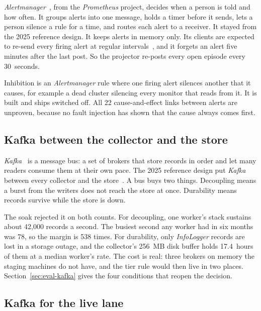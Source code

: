 \textit{Alertmanager}~\cite{ref:alertmanager}, from the \textit{Prometheus} project, decides when a person is told and how often. It groups alerts into one message, holds a timer before it sends, lets a person silence a rule for a time, and routes each alert to a receiver. It stayed from the 2025 reference design. It keeps alerts in memory only. Its clients are expected to re-send every firing alert at regular intervals~\cite{ref:amapi}, and it forgets an alert five minutes after the last post. So the projector re-posts every open episode every 30~seconds.

Inhibition is an \textit{Alertmanager} rule where one firing alert silences another that it causes, for example a dead cluster silencing every monitor that reads from it. It is built and ships switched off. All 22 cause-and-effect links between alerts are unproven, because no fault injection has shown that the cause always comes first.

\subsection{Kafka between the collector and the store}\label{sec:why-kafka-store}

\textit{Kafka}~\cite{ref:kafka} is a message bus: a set of brokers that store records in order and let many readers consume them at their own pace. The 2025 reference design put \textit{Kafka} between every collector and the store~\cite{ref:papadopoulos2025}. A bus buys two things. Decoupling means a burst from the writers does not reach the store at once. Durability means records survive while the store is down.

The soak rejected it on both counts. For decoupling, one worker's stack sustains about 42,000 records a second. The busiest second any worker had in six months was 78, so the margin is 538 times. For durability, only \textit{InfoLogger} records are lost in a storage outage, and the collector's 256~MB disk buffer holds 17.4~hours of them at a median worker's rate. The cost is real: three brokers on memory the staging machines do not have, and the tier rule would then live in two places. Section~\ref{sec:eval-kafka} gives the four conditions that reopen the decision.

\subsection{Kafka for the live lane}\label{sec:why-kafka-live}

